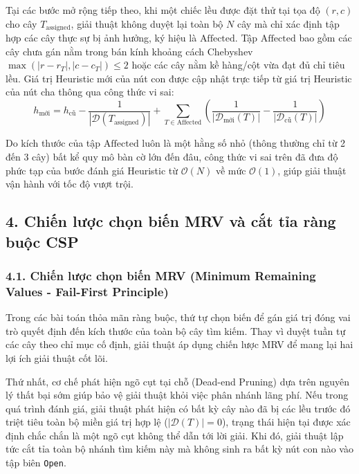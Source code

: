 \documentclass[a4paper,12pt]{article}
\begin{document}
Tại các bước mở rộng tiếp theo, khi một chiếc lều được đặt thử tại tọa độ $(r, c)$ cho cây $T_{\text{assigned}}$, giải thuật không duyệt lại toàn bộ $N$ cây mà chỉ xác định tập hợp các cây thực sự bị ảnh hưởng, ký hiệu là $\text{Affected}$. Tập $\text{Affected}$ bao gồm các cây chưa gán nằm trong bán kính khoảng cách Chebyshev $\max(|r - r_T|, |c - c_T|) \le 2$ hoặc các cây nằm kề hàng/cột vừa đạt đủ chỉ tiêu lều. Giá trị Heuristic mới của nút con được cập nhật trực tiếp từ giá trị Heuristic của nút cha thông qua công thức vi sai:
\begin{equation}
    h_{\text{mới}} = h_{\text{cũ}} - \frac{1}{|\mathcal{D}(T_{\text{assigned}})|} + \sum_{T \in \text{Affected}} \left( \frac{1}{|\mathcal{D}_{\text{mới}}(T)|} - \frac{1}{|\mathcal{D}_{\text{cũ}}(T)|} \right)
\end{equation}

Do kích thước của tập $\text{Affected}$ luôn là một hằng số nhỏ (thông thường chỉ từ 2 đến 3 cây) bất kể quy mô bàn cờ lớn đến đâu, công thức vi sai trên đã đưa độ phức tạp của bước đánh giá Heuristic từ $\mathcal{O}(N)$ về mức $\mathcal{O}(1)$, giúp giải thuật vận hành với tốc độ vượt trội.

\subsection*{4. Chiến lược chọn biến MRV và cắt tỉa ràng buộc CSP}

\subsubsection*{4.1. Chiến lược chọn biến MRV (Minimum Remaining Values - Fail-First Principle)}
Trong các bài toán thỏa mãn ràng buộc, thứ tự chọn biến để gán giá trị đóng vai trò quyết định đến kích thước của toàn bộ cây tìm kiếm. Thay vì duyệt tuần tự các cây theo chỉ mục cố định, giải thuật áp dụng chiến lược MRV để mang lại hai lợi ích giải thuật cốt lõi.

Thứ nhất, cơ chế phát hiện ngõ cụt tại chỗ (Dead-end Pruning) dựa trên nguyên lý thất bại sớm giúp bảo vệ giải thuật khỏi việc phân nhánh lãng phí. Nếu trong quá trình đánh giá, giải thuật phát hiện có bất kỳ cây nào đã bị các lều trước đó triệt tiêu toàn bộ miền giá trị hợp lệ ($|\mathcal{D}(T)| = 0$), trạng thái hiện tại được xác định chắc chắn là một ngõ cụt không thể dẫn tới lời giải. Khi đó, giải thuật lập tức cắt tỉa toàn bộ nhánh tìm kiếm này mà không sinh ra bất kỳ nút con nào vào tập biên \texttt{Open}.
\end{document}
